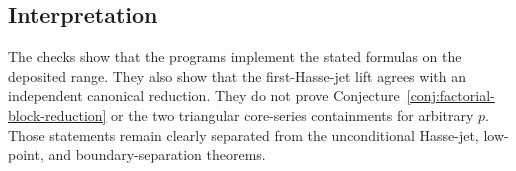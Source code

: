 \subsection{Interpretation}

The checks show that the programs implement the stated formulas on the
deposited range.  They also show that the first-Hasse-jet lift agrees with
an independent canonical reduction.  They do not prove
Conjecture~\ref{conj:factorial-block-reduction} or the two triangular
core-series containments for arbitrary $p$.  Those statements remain
clearly separated from the unconditional Hasse-jet, low-point, and
boundary-separation theorems.
